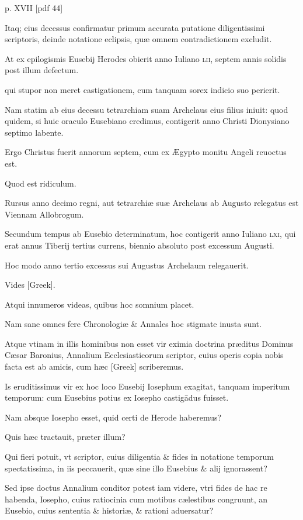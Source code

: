 \begin{parnumbers}
\clearpage
p. XVII [pdf 44]

Itaq; eius decessus confirmatur primum accurata putatione
diligentissimi scriptoris, deinde notatione eclipsis, quæ omnem contradictionem
excludit.

At ex epilogismis Eusebij Herodes obierit
anno Iuliano \textsc{lii}, septem annis solidis post illum defectum.

qui stupor non meret castigationem, cum tanquam sorex indicio suo perierit.

Nam statim ab eius decessu tetrarchiam suam Archelaus eius filius
iniuit: quod quidem, si huic oraculo Eusebiano credimus, contigerit
anno Christi Dionysiano septimo labente.

Ergo Christus fuerit
annorum septem, cum ex Ægypto monitu Angeli reuoctus est.

Quod est ridiculum.

Rursus anno decimo regni, aut tetrarchiæ suæ
Archelaus ab Augusto relegatus est Viennam Allobrogum.

Secundum tempus ab Eusebio determinatum, hoc contigerit anno Iuliano
\textsc{lxi}, qui erat annus Tiberij tertius currens, biennio absoluto
post excessum Augusti.

Hoc modo anno tertio excessus sui Augustus
Archelaum relegauerit.

Vides \textgreek{[Greek]}.

Atqui innumeros videas,
quibus hoc somnium placet.

Nam sane omnes fere Chronologiæ
\& Annales hoc stigmate inusta sunt.

Atque vtinam in illis hominibus
non esset vir eximia doctrina præditus Dominus Cæsar Baronius,
Annalium Ecclesiasticorum scriptor, cuius operis copia nobis
facta est ab amicis, cum hæc \textgreek{[Greek]} scriberemus.

Is eruditissimus
vir ex hoc loco Eusebij Iosephum exagitat, tanquam imperitum
temporum: cum Eusebius potius ex Iosepho castigādus fuisset.

Nam absque Iosepho esset, quid certi de Herode haberemus?

Quis hæc tractauit, præter illum?

Qui fieri potuit, vt scriptor, cuius diligentia
\& fides in notatione temporum spectatissima, in iis peccauerit,
quæ sine illo Eusebius \& alij ignorassent?

Sed ipse doctus Annalium
conditor potest iam videre, vtri fides de hac re habenda, Iosepho,
cuius ratiocinia cum motibus cælestibus congruunt, an Eusebio,
cuius sententia \& historiæ, \& rationi aduersatur?


\end{parnumbers}
